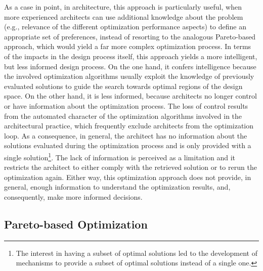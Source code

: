 	As a case in point, in architecture, this approach is particularly useful, when more experienced architects can use additional knowledge about the problem (e.g., relevance of the different optimization performance aspects) to define an appropriate set of preferences, instead of resorting to the analogous Pareto-based approach, which would yield a far more complex optimization process. In terms of the impacts in the design process itself, this approach yields a more intelligent, but less informed design process. On the one hand, it confers intelligence because the involved optimization algorithms usually exploit the knowledge of previously evaluated solutions to guide the search towards optimal regions of the design space. On the other hand, it is less informed, because architects no longer control or have information about the optimization process. The loss of control results from the automated character of the optimization algorithms involved in the architectural practice, which frequently exclude architects from the optimization loop. As a consequence, in general, the architect has no information about the solutions evaluated during the optimization process and is only provided with a single solution\footnote{The interest in having a subset of optimal solutions led to the development of mechanisms to provide a subset of optimal solutions instead of a single one.}. The lack of information is perceived as a limitation \cite{Cichocka2017SURVEY} and it restricts the architect to either comply with the retrieved solution or to rerun the optimization again. Either way, this optimization approach does not provide, in general, enough information to understand the optimization results, and, consequently, make more informed decisions. 
	
	\subsection{Pareto-based Optimization}
	\label{ssec:pareto}
	
